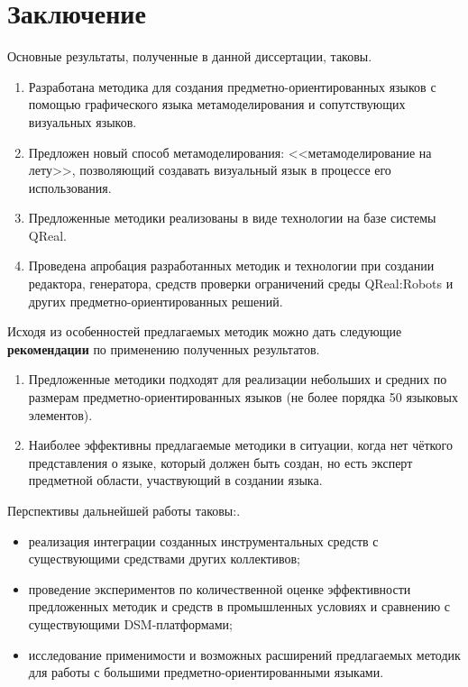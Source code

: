 \chapter*{Заключение}
Основные результаты, полученные в данной диссертации, таковы.
\begin{enumerate}
	\item Разработана методика для создания предметно-ориентированных языков с помощью 
		графического языка метамоделирования и сопутствующих визуальных языков.
	\item Предложен новый способ метамоделирования: <<метамоделирование на лету>>, позволяющий
		создавать визуальный язык в процессе его использования.
	\item Предложенные методики реализованы в виде технологии на базе системы QReal.
	\item Проведена апробация разработанных методик и технологии при создании редактора, 
		генератора, средств проверки ограничений среды QReal:Robots и других предметно-ориентированных 
		решений.
\end{enumerate}

Исходя из особенностей предлагаемых методик можно дать следующие \textbf{рекомендации} 
по применению полученных результатов.
\begin{enumerate}
	\item Предложенные методики подходят для реализации небольших и средних по размерам 
		предметно-ориентированных языков (не более порядка 50 языковых элементов).
	\item Наиболее эффективны предлагаемые методики в ситуации, когда нет чёткого представления
		о языке, который должен быть создан, но есть эксперт предметной области, участвующий
		в создании языка.
\end{enumerate}

Перспективы дальнейшей работы таковы:.
\begin{itemize}
	\item реализация интеграции созданных инструментальных средств с существующими 
		средствами других коллективов;
	\item проведение экспериментов по количественной оценке эффективности предложенных 
		методик и средств в промышленных условиях и сравнению с существующими DSM-платформами;
	\item исследование применимости и возможных расширений предлагаемых методик для работы
		с большими предметно-ориентированными языками.
\end{itemize}
